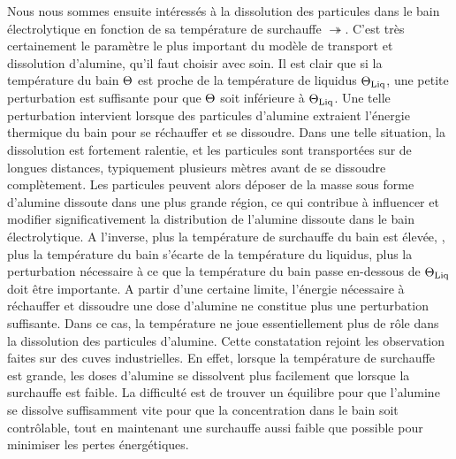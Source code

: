 Nous nous sommes ensuite intéressés à la dissolution des particules
dans le bain électrolytique en fonction de sa température de
surchauffe $\tsur$. C'est très certainement le paramètre le plus
important du modèle de transport et dissolution d'alumine, qu'il faut
choisir avec soin. Il est clair que si la température du bain
$\Theta$ est proche de la température de liquidus $\Theta_\text{Liq}$, une
petite perturbation est suffisante pour que $\Theta$ soit
inférieure à $\Theta_\text{Liq}$. Une telle perturbation intervient lorsque des
particules d'alumine extraient l'énergie thermique du bain pour se
réchauffer et se dissoudre. Dans une telle situation, la dissolution
est fortement ralentie, et les particules sont transportées sur de
longues distances, typiquement plusieurs mètres avant de se dissoudre
complètement. Les particules peuvent alors déposer de la masse sous
forme d'alumine dissoute dans une plus grande région, ce qui contribue
à influencer et modifier significativement la distribution de
l'alumine dissoute dans le bain électrolytique. A l'inverse, plus la
température de surchauffe du bain est élevée, \ie, plus la température
du bain s'écarte de la température du liquidus, plus la perturbation
nécessaire à ce que la température du bain passe en-dessous de $\Theta_\text{Liq}$
doit être importante. A partir d'une certaine limite, l'énergie
nécessaire à réchauffer et dissoudre une dose d'alumine ne constitue
plus une perturbation suffisante. Dans ce cas, la température ne joue
essentiellement plus de rôle dans la dissolution des particules
d'alumine. Cette constatation rejoint les observation faites sur des
cuves industrielles. En effet, lorsque la température de surchauffe
est grande, les doses d'alumine se dissolvent plus facilement que
lorsque la surchauffe est faible. La difficulté est de trouver un
équilibre pour que l'alumine se dissolve suffisamment vite pour que la
concentration dans le bain soit contrôlable, tout en maintenant une
surchauffe aussi faible que possible pour minimiser les pertes
énergétiques.

